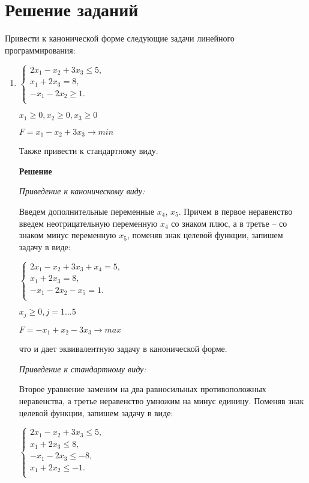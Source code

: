 \documentclass[12pt]{article}
\begin{document}
\section*{Решение заданий}
Привести к канонической форме следующие задачи линейного
программирования:
\begin{enumerate}
\item
\begin{center}
$\begin{cases}
  2x_1 -x_2+3x_3 \le 5,\\ 
  x_1 +2x_3 =8,\\
  -x_1 -2x_2\ge 1.\\
\end{cases}$

$x_1\ge0, x_2\ge0, x_3\ge0$

$F=x_1-x_2 +3x_3 \rightarrow min$

Также привести к стандартному виду.
\end{center}

\textbf{Решение}

\textit{Приведение к каноническому виду:}

Введем дополнительные переменные $x_4$, $ x_5$. Причем в первое неравенство
введем неотрицательную переменную $x_4$ со знаком плюс, а в третье – со
знаком минус переменную $x_5$, поменяв знак целевой функции,  запишем задачу в виде:
\begin{center}
$\begin{cases}
  2x_1 -x_2+3x_3  + x_4= 5,\\ 
  x_1 +2x_3 =8,\\
  -x_1 -2x_2-x_5= 1.\\
\end{cases}$

$x_j\ge0,j =1...5$

$F=-x_1+x_2 -3x_3 \rightarrow max$
\end{center}
что и дает эквивалентную задачу в канонической форме.

\textit{Приведение к стандартному виду:}

Второе уравнение заменим на два равносильных противоположных неравенства, а третье неравенство умножим на минус единицу. Поменяв знак целевой функции, запишем задачу в виде:
\begin{center}
$\begin{cases}
  2x_1 -x_2+3x_3 \le 5,\\ 
  x_1 +2x_3 \le8,\\
  -x_1 -2x_3 \le-8,\\
  x_1 +2x_2\le -1.\\
\end{cases}$


\end{center}
\end{enumerate}
\end{document}
